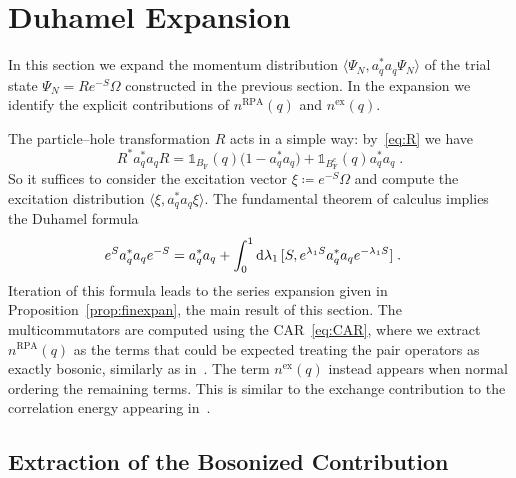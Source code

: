 \documentclass[12pt,a4paper]{article}
\numberwithin{equation}{section}
\newcommand{\1}{\mathbb{I}}
\newcommand{\di}{\textnormal{d}}
\newcommand{\ex}{\mathrm{ex}}
\newcommand{\F}{\mathrm{F}}
\newcommand{\RPA}{\mathrm{RPA}}
\theoremstyle{plain}
\theoremstyle{definition}
\theoremstyle{remark}
\theoremstyle{plain}
\theoremstyle{definition}
\theoremstyle{remark}
\begin{document}
\section{Duhamel Expansion}\label{sec:extraction}

In this section we expand the momentum distribution $ \langle \Psi_N, a_q^* a_q \Psi_N \rangle $ of the trial state $ \Psi_N = R e^{-S} \Omega $ constructed in the previous section. In the expansion we identify the explicit contributions of $ n^{\RPA}(q) $ and $ n^{\ex}(q) $.

The particle--hole transformation $ R $ acts in a simple way: by~\eqref{eq:R} we have
\begin{equation} \label{eq:momentum_dist_R_trafo}
	R^* a_q^* a_q R
	= \mathds{1}_{B_{\F}}(q) \big( 1 - a_q^* a_q  \big)
		+ \mathds{1}_{B_{\F}^c}(q)  a_q^* a_q \;.
\end{equation}
So it suffices to consider the excitation vector $ \xi \coloneq e^{-S} \Omega $ and compute the excitation distribution $ \langle \xi, a_q^* a_q \xi \rangle $. The fundamental theorem of calculus implies the Duhamel formula
\begin{equation} \label{eq:duhamelexpansion_blueprint}
\begin{aligned}
	e^{S} a_q^* a_q e^{-S}
& = a_q^* a_q
		+ \int_0^1 \di \lambda_1 \,   [S, e^{\lambda_1 S} a_q^* a_q e^{-\lambda_1 S}] \;.
\end{aligned}
\end{equation}
Iteration of this formula leads to the series expansion given in Proposition~\ref{prop:finexpan}, the main result of this section. The multicommutators are computed using the CAR~\eqref{eq:CAR}, where we extract $ n^{\RPA}(q) $ as the terms that could be expected treating the pair operators as exactly bosonic, similarly as in~\cite{BL25}. The term $ n^{\ex}(q) $ instead appears when normal ordering the remaining terms. This is similar to the exchange contribution to the correlation energy appearing in~\cite{CHN23}.


\subsection{Extraction of the Bosonized Contribution}
\label{sec:extraction_bos}
\end{document}
